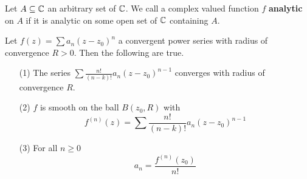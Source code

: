 \begin{definition}
    Let $A \subseteq \mathbb{C}$ an arbitrary set of  $\mathbb{C}$. We call a complex valued
    function $f$ \textbf{analytic} on $A$ if it is analytic on some open set of
     $\mathbb{C}$ containing  $A$.
\end{definition}

\begin{theorem}\label{3.2.4}
    Let $f(z)=\sum{a_n(z-z_0)^n}$ a convergent power series with radius of
    convergence $R>0$. Then the following are true.
    \begin{enumerate}
        \item[(1)] The series $\sum{\frac{n!}{(n-k)!}a_n(z-z_0)^{n-1}}$
            converges with radius of convergence $R$.

        \item[(2)] $f$ is smooth on the ball  $B(z_0,R)$ with
            \begin{equation*}
                f^{(n)}(z)=\sum{\frac{n!}{(n-k)!}a_n(z-z_0)^{n-1}}
            \end{equation*}

        \item[(3)] For all $n \geq 0$
            \begin{equation*}
                a_n=\frac{f^{(n)}(z_0)}{n!}
            \end{equation*}
    \end{enumerate}
\end{theorem}
